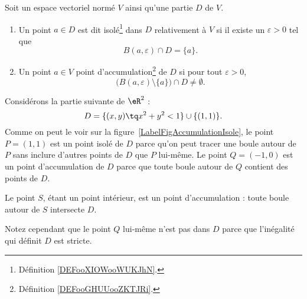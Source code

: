 \begin{lemma}       \label{LEMooOMVNooVBlQMD}
	Soit un espace vectoriel normé \( V\) ainsi qu'une partie \( D\) de \( V\).
	\begin{enumerate}
		\item
		      Un point \( a\in D\) est dit isolé\footnote{Définition \ref{DEFooXIOWooWUKJhN}.} dans \( D\) relativement à \( V\) si il existe un \( \varepsilon>0\) tel que
		      \begin{equation}
			      B(a,\varepsilon)\cap D=\{ a \}.
		      \end{equation}
		\item
		      Un point \( a\in V\) point d'accumulation\footnote{Définition \ref{DEFooGHUUooZKTJRi}.} de \( D\) si pour tout \( \varepsilon>0\),
		      \begin{equation}
			      \Big( B(a,\varepsilon)\setminus\{ a \}\Big)\cap D\neq \emptyset.
		      \end{equation}
	\end{enumerate}
\end{lemma}

\newcommand{\CaptionFigAccumulationIsole}{L'ensemble décrit par l'équation \eqref{Eq2807BouleIso}. Le point \( P\) est un point isolé de \( D\), tandis que  les points \( S\) et \( Q\) sont des points d'accumulation.}


\begin{example}
	Considérons la partie suivante de \( \eR^2\) :
	\begin{equation}	\label{Eq2807BouleIso}
		D=\{ (x,y)\tq x^2+y^2<1\}\cup\{ (1,1) \}.
	\end{equation}
	Comme on peut le voir sur la figure~\ref{LabelFigAccumulationIsole}, le point \( P=(1,1)\) est un point isolé de \( D\) parce qu'on peut tracer une boule autour de \( P\) sans inclure d'autres points de \( D\) que \( P\) lui-même. Le point \( Q=(-1,0)\) est un point d'accumulation de \( D\) parce que toute boule autour de \( Q\) contient des points de \( D\).

	Le point \( S\), étant un point intérieur, est un point d'accumulation : toute boule autour de \( S\) intersecte \( D\).

	Notez cependant que le point \( Q\) lui-même n'est pas dans \( D\) parce que l'inégalité qui définit \( D\) est stricte.
\end{example}

